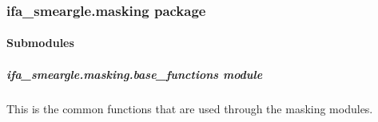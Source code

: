 \documentclass[letterpaper,10pt,english]{sphinxmanual}
\begin{document}
\subsubsection{ifa\_smeargle.masking package}
\label{\detokenize{docstrings/ifa_smeargle.masking:ifa-smeargle-masking-package}}\label{\detokenize{docstrings/ifa_smeargle.masking::doc}}

\paragraph{Submodules}
\label{\detokenize{docstrings/ifa_smeargle.masking:submodules}}

\subparagraph{ifa\_smeargle.masking.base\_functions module}
\label{\detokenize{docstrings/ifa_smeargle.masking.base_functions:module-ifa_smeargle.masking.base_functions}}\label{\detokenize{docstrings/ifa_smeargle.masking.base_functions:ifa-smeargle-masking-base-functions-module}}\label{\detokenize{docstrings/ifa_smeargle.masking.base_functions::doc}}
This is the common functions that are used through the masking
modules.
\end{document}
